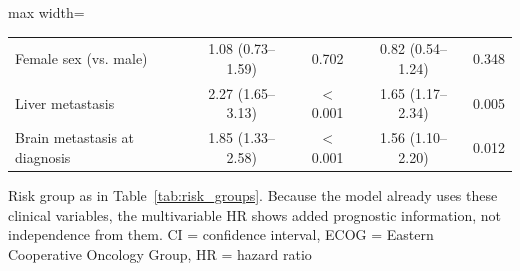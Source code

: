 \begin{table}[htbp]
\begin{adjustbox}{max width=\textwidth}
\begin{tabular}{@{}l cc cc@{}}
\quad Female sex (vs. male) & 1.08 (0.73--1.59) & 0.702 & 0.82 (0.54--1.24) & 0.348 \\
\quad Liver metastasis & 2.27 (1.65--3.13) & $<$ 0.001 & 1.65 (1.17--2.34) & 0.005 \\
\quad Brain metastasis at diagnosis & 1.85 (1.33--2.58) & $<$ 0.001 & 1.56 (1.10--2.20) & 0.012 \\
\bottomrule
\end{tabular}%
\end{adjustbox}
\par\smallskip
\begin{minipage}{\textwidth}\footnotesize
Risk group as in Table~\ref{tab:risk_groups}. Because the model already uses these clinical variables, the multivariable HR shows added prognostic information, not independence from them. CI = confidence interval, ECOG = Eastern Cooperative Oncology Group, HR = hazard ratio
\end{minipage}
\end{table}
\addtocounter{table}{-1}

